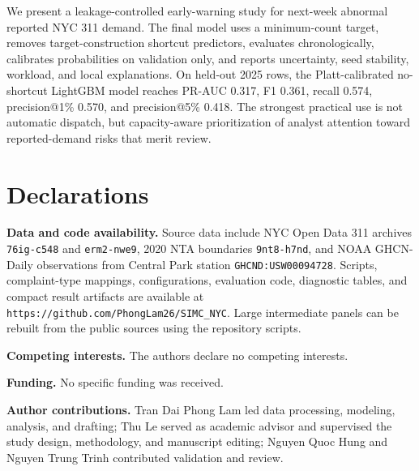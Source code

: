 \documentclass[pdflatex,sn-mathphys-num]{sn-jnl}
\renewcommand{\bibfont}{\footnotesize}
\begin{document}
We present a leakage-controlled early-warning study for next-week abnormal reported NYC 311 demand. The final model uses a minimum-count target, removes target-construction shortcut predictors, evaluates chronologically, calibrates probabilities on validation only, and reports uncertainty, seed stability, workload, and local explanations. On held-out 2025 rows, the Platt-calibrated no-shortcut LightGBM model reaches PR-AUC 0.317, F1 0.361, recall 0.574, precision@1\% 0.570, and precision@5\% 0.418. The strongest practical use is not automatic dispatch, but capacity-aware prioritization of analyst attention toward reported-demand risks that merit review.

\section*{Declarations}

\begingroup
\setlength{\parskip}{1pt}
\noindent\textbf{Data and code availability.} Source data include NYC Open Data 311 archives \texttt{76ig-c548} and \texttt{erm2-nwe9}, 2020 NTA boundaries \texttt{9nt8-h7nd}, and NOAA GHCN-Daily observations from Central Park station \texttt{GHCND:USW00094728}. Scripts, complaint-type mappings, configurations, evaluation code, diagnostic tables, and compact result artifacts are available at \texttt{https://github.com/PhongLam26/SIMC\_NYC}. Large intermediate panels can be rebuilt from the public sources using the repository scripts.\par
\noindent\textbf{Competing interests.} The authors declare no competing interests.\par
\noindent\textbf{Funding.} No specific funding was received.\par
\noindent\textbf{Author contributions.} Tran Dai Phong Lam led data processing, modeling, analysis, and drafting; Thu Le served as academic advisor and supervised the study design, methodology, and manuscript editing; Nguyen Quoc Hung and Nguyen Trung Trinh contributed validation and review.
\endgroup

\setlength{\bibsep}{0pt}
\renewcommand{\bibfont}{\footnotesize}

\end{document}
